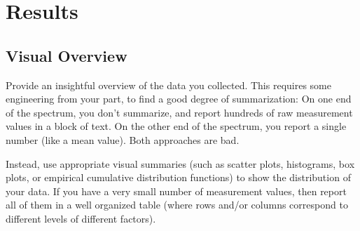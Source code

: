 \documentclass{article}
\begin{document}
\section{Results}
\subsection{Visual Overview}
Provide an insightful overview of the data you collected. This requires some engineering from your part, to find a good degree of summarization: On one end of the spectrum, you don't summarize, and report hundreds of raw measurement values in a block of text. On the other end of the spectrum, you report a single number (like a mean value). Both approaches are bad.

Instead, use appropriate visual summaries (such as scatter plots, histograms, box plots, or empirical cumulative distribution functions) to show the distribution of your data. If you have a very small number of measurement values, then report all of them in a well organized table (where rows and/or columns correspond to different levels of different factors).
\end{document}
